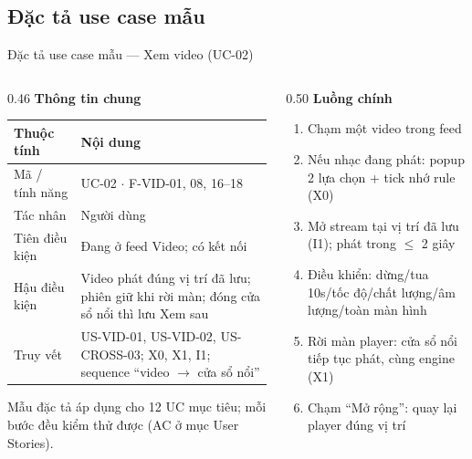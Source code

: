 \subsection{Đặc tả use case mẫu}
\begin{frame}{Đặc tả use case mẫu --- Xem video (UC-02)}
\begin{columns}[T]
\begin{column}{0.46\textwidth}
{\small\textbf{Thông tin chung}}\\[1.2mm]
{\tiny
\begin{tabular}{@{}p{1.9cm}p{4.6cm}@{}}
\toprule
\textbf{Thuộc tính} & \textbf{Nội dung} \\
\midrule
Mã / tính năng & UC-02 $\cdot$ F-VID-01, 08, 16--18 \\
Tác nhân & Người dùng \\
Tiên điều kiện & Đang ở feed Video; có kết nối \\
Hậu điều kiện & Video phát đúng vị trí đã lưu; phiên giữ khi rời màn; đóng cửa sổ nổi thì lưu Xem sau \\
Truy vết & US-VID-01, US-VID-02, US-CROSS-03; X0, X1, I1; sequence ``video $\rightarrow$ cửa sổ nổi'' \\
\bottomrule
\end{tabular}}
\vspace{1.5mm}

{\scriptsize\color{TextGray} Mẫu đặc tả áp dụng cho 12 UC mục tiêu; mỗi bước đều kiểm thử được (AC ở mục User Stories).}
\end{column}
\begin{column}{0.50\textwidth}
{\small\textbf{Luồng chính}}\\[0.8mm]
{\scriptsize
\begin{enumerate}\setlength{\itemsep}{0.8pt}
\item Chạm một video trong feed
\item Nếu nhạc đang phát: popup 2 lựa chọn + tick nhớ rule (X0)
\item Mở stream tại vị trí đã lưu (I1); phát trong $\leq$ 2 giây
\item Điều khiển: dừng/tua 10s/tốc độ/chất lượng/âm lượng/toàn màn hình
\item Rời màn player: cửa sổ nổi tiếp tục phát, cùng engine (X1)
\item Chạm ``Mở rộng'': quay lại player đúng vị trí
\end{enumerate}}
\vspace{1mm}


\end{column}
\end{columns}
\end{frame}
